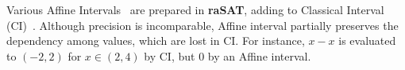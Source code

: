\documentclass[runningheads,a4paper,oribibl]{llncs}
\newcommand{\Real}{{\mathbb R}}
\newcommand{\suppress}[1]{} %
\begin{document}
\suppress{
\begin{definition}\label{def:Testing}
Let $M = \bigwedge \limits_{i=1}^m x_i \in (a_i,b_i)$ and 
${\mathcal P} = \bigwedge \limits_{i=1}^m f_i(x_1,\cdots,x_n) > 0$. 
%
Let a choice function $\theta : (\Real \times \Real)^n \rightarrow \Real^n$ 
such that $\theta(M) \in (a_1,b_1) \times \cdots \times (a_n,b_n)$. 
Testing is a finite set $\Theta$ of choice functions. Then, we say 
\begin{itemize}
\item ${\mathcal P}$ is \emph{Test-SAT} under $M$ if $\theta(M)$ holds ${\mathcal P}$ 
for some $\theta \in \Theta$, and 
\item ${\mathcal P}$ is \emph{Test-UNSAT} under $M$ if $\theta(M)$ never holds ${\mathcal P}$ 
for each $\theta \in \Theta$. 
\end{itemize} 
\end{definition}
}


Various Affine Intervals~\cite{Comba93affinearithmetic} are prepared in 
{\bf raSAT}, adding to Classical Interval (CI)~\cite{moore}. 
Although precision is incomparable, 
Affine interval partially preserves the dependency among values, which are lost in CI. 
For instance, $x - x$ is evaluated to $(-2,2)$ for $x \in (2,4)$ by CI, but $0$ by an Affine interval.
\end{document}
